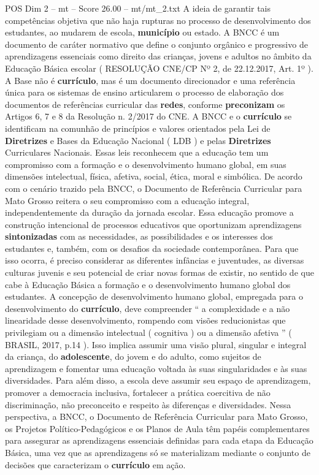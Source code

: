 \begin{textsample}{POS Dim 2 – mt – Score 26.00 – mt/mt\_2.txt}
A ideia de garantir tais competências objetiva que não haja rupturas no processo de desenvolvimento dos estudantes, ao mudarem de escola, \textbf{município} ou estado.
A BNCC é um documento de caráter normativo que define o conjunto orgânico e progressivo de aprendizagens essenciais como direito das crianças, jovens e adultos no âmbito da Educação Básica escolar ( RESOLUÇÃO CNE/CP Nº 2, de 22.12.2017, Art. 1º ).
A Base não é \textbf{currículo}, mas é um documento direcionador e uma referência única para os sistemas de ensino articularem o processo de elaboração dos documentos de referências curricular das \textbf{redes}, conforme \textbf{preconizam} os Artigos 6, 7 e 8 da Resolução n. 2/2017 do CNE.
A BNCC e o \textbf{currículo} se identificam na comunhão de princípios e valores orientados pela Lei de \textbf{Diretrizes} e Bases da Educação Nacional ( LDB ) e pelas \textbf{Diretrizes} Curriculares Nacionais.
Essas leis reconhecem que a educação tem um compromisso com a formação e o desenvolvimento humano global, em suas dimensões intelectual, física, afetiva, social, ética, moral e simbólica.
De acordo com o cenário trazido pela BNCC, o Documento de Referência Curricular para Mato Grosso reitera o seu compromisso com a educação integral, independentemente da duração da jornada escolar.
Essa educação promove a construção intencional de processos educativos que oportunizam aprendizagens \textbf{sintonizadas} com as necessidades, as possibilidades e os interesses dos estudantes e, também, com os desafios da sociedade contemporânea.
Para que isso ocorra, é preciso considerar as diferentes infâncias e juventudes, as diversas culturas juvenis e seu potencial de criar novas formas de existir, no sentido de que cabe à Educação Básica a formação e o desenvolvimento humano global dos estudantes.
A concepção de desenvolvimento humano global, empregada para o desenvolvimento do \textbf{currículo}, deve compreender “ a complexidade e a não linearidade desse desenvolvimento, rompendo com visões reducionistas que privilegiam ou a dimensão intelectual ( cognitiva ) ou a dimensão afetiva ” ( BRASIL, 2017, p.14 ).
Isso implica assumir uma visão plural, singular e integral da criança, do \textbf{adolescente}, do jovem e do adulto, como sujeitos de aprendizagem e fomentar uma educação voltada às suas singularidades e às suas diversidades.
Para além disso, a escola deve assumir seu espaço de aprendizagem, promover a democracia inclusiva, fortalecer a prática coercitiva de não discriminação, não preconceito e respeito às diferenças e diversidades.
Nessa perspectiva, a BNCC, o Documento de Referência Curricular para Mato Grosso, os Projetos Político-Pedagógicos e os Planos de Aula têm papéis complementares para assegurar as aprendizagens essenciais definidas para cada etapa da Educação Básica, uma vez que as aprendizagens só se materializam mediante o conjunto de decisões que caracterizam o \textbf{currículo} em ação.

\end{textsample}
